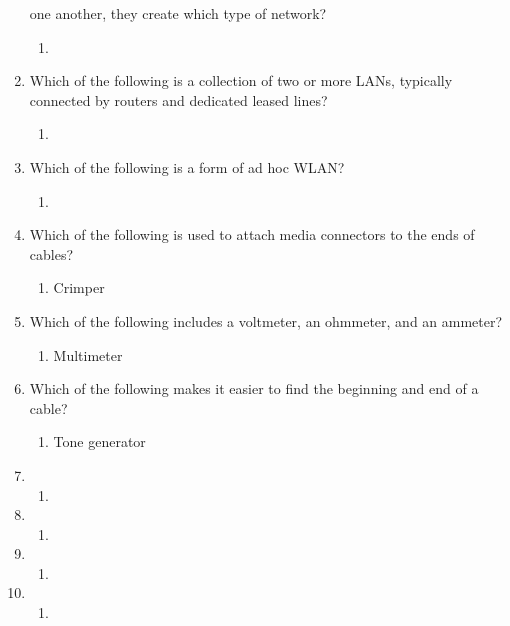 \documentclass{article}
\begin{document}
\begin{enumerate}
one another, they create which type of network?
    \begin{enumerate}
        \item 
    \end{enumerate}
    \item Which of the following is a collection of two or more LANs, typically connected by routers
and dedicated leased lines?
    \begin{enumerate}
        \item 
    \end{enumerate}
    \item Which of the following is a form of ad hoc WLAN?
    \begin{enumerate}
        \item 
    \end{enumerate}
    \item Which of the following is used to attach media connectors to the ends of cables?
    \begin{enumerate}
        \item Crimper
    \end{enumerate}
    \item Which of the following includes a voltmeter, an ohmmeter, and an ammeter?
    \begin{enumerate}
        \item Multimeter
    \end{enumerate}
    \item Which of the following makes it easier to find the beginning and end of a cable?
    \begin{enumerate}
        \item Tone generator 
    \end{enumerate}
    \item 
    \begin{enumerate}
        \item 
    \end{enumerate}
    \item 
    \begin{enumerate}
        \item 
    \end{enumerate}
    \item 
    \begin{enumerate}
        \item 
    \end{enumerate}
    \item 
    \begin{enumerate}
        \item 
    \end{enumerate}
    
\end{enumerate}
\end{document}
